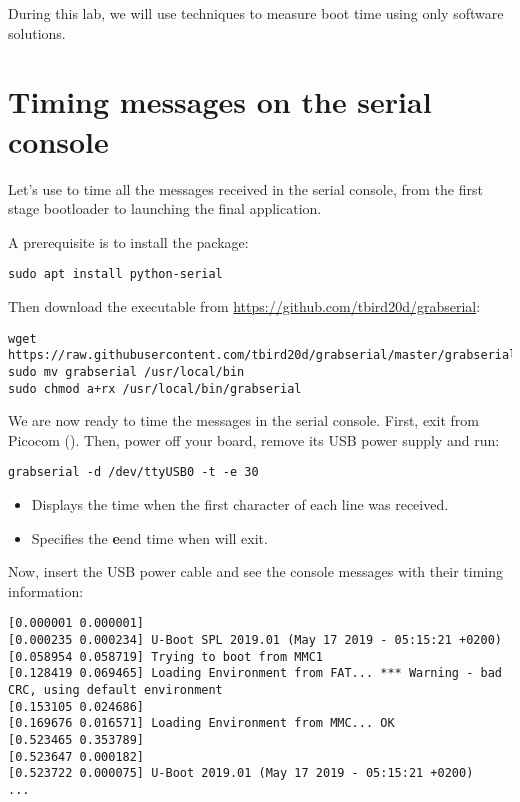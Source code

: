 
During this lab, we will use techniques to measure boot time using only
software solutions.

\section{Timing messages on the serial console}

Let's use  to time all the messages received in the
serial console, from the first stage bootloader to launching the final
application.

A prerequisite is to install the  package:
\begin{verbatim}
sudo apt install python-serial
\end{verbatim}

Then download the  executable from
\url{https://github.com/tbird20d/grabserial}:

\begin{verbatim}
wget https://raw.githubusercontent.com/tbird20d/grabserial/master/grabserial
sudo mv grabserial /usr/local/bin
sudo chmod a+rx /usr/local/bin/grabserial
\end{verbatim}

We are now ready to time the messages in the serial console. First, exit
from Picocom (\code{[Ctrl][a] [Ctrl][x]}). Then, power off your board,
remove its USB power supply and run:

\begin{verbatim}
grabserial -d /dev/ttyUSB0 -t -e 30
\end{verbatim}

\begin{itemize}
\item {} Displays the time when the first character of each line
was received.
\item {} Specifies the {\bf e}end time when 
will exit.
\end{itemize}

Now, insert the USB power cable and see the console messages with their
timing information:

\begin{verbatim}
[0.000001 0.000001] 
[0.000235 0.000234] U-Boot SPL 2019.01 (May 17 2019 - 05:15:21 +0200)
[0.058954 0.058719] Trying to boot from MMC1
[0.128419 0.069465] Loading Environment from FAT... *** Warning - bad CRC, using default environment
[0.153105 0.024686] 
[0.169676 0.016571] Loading Environment from MMC... OK
[0.523465 0.353789] 
[0.523647 0.000182] 
[0.523722 0.000075] U-Boot 2019.01 (May 17 2019 - 05:15:21 +0200)
...
\end{verbatim}

